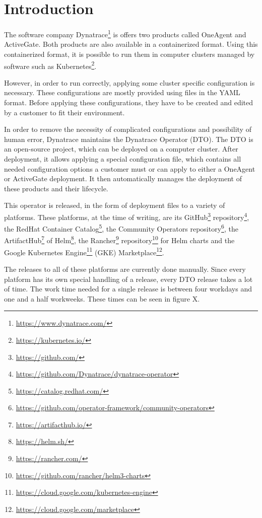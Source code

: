 \chapter{Introduction}
\label{ch:introduction}

The software company Dynatrace\footnote{\url{https://www.dynatrace.com/}} is offers two products called OneAgent and ActiveGate.
Both products are also available in a containerized format.
Using this containerized format, it is possible to run them in computer clusters managed by software such as Kubernetes\footnote{\url{https://kubernetes.io/}}.

However, in order to run correctly, applying some cluster specific configuration is necessary.
These configurations are mostly provided using files in the YAML format\cite{UnderstandingKubernetesObjects}.
Before applying these configurations, they have to be created and edited by a customer to fit their environment.

In order to remove the necessity of complicated configurations and possibility of human error, Dynatrace maintains the Dynatrace Operator (DTO).
The DTO is an open-source project, which can be deployed on a computer cluster.
After deployment, it allows applying a special configuration file, which contains all needed configuration options a customer must or can apply to either a OneAgent or ActiveGate deployment.
It then automatically manages the deployment of these products and their lifecycle.

This operator\cite{OperatorPattern} is released, in the form of deployment files to a variety of platforms.
These platforms, at the time of writing, are
its GitHub\footnote{\url{https://github.com/}} repository\footnote{\url{https://github.com/Dynatrace/dynatrace-operator}},
the RedHat Container Catalog\footnote{\url{https://catalog.redhat.com/}},
the Community Operators repository\footnote{\url{https://github.com/operator-framework/community-operators}},
the ArtifactHub\footnote{\url{https://artifacthub.io/}} of Helm\footnote{\url{https://helm.sh/}},
the Rancher\footnote{\url{https://rancher.com/}} repository\footnote{\url{https://github.com/rancher/helm3-charts}} for Helm charts and
the Google Kubernetes Engine\footnote{\url{https://cloud.google.com/kubernetes-engine}} (GKE) Marketplace\footnote{\url{https://cloud.google.com/marketplace}}.

The releases to all of these platforms are currently done manually.
Since every platform has its own special handling of a release, every DTO release takes a lot of time.
The work time needed for a single release is between four workdays and one and a half workweeks.
These times can be seen in figure X.


